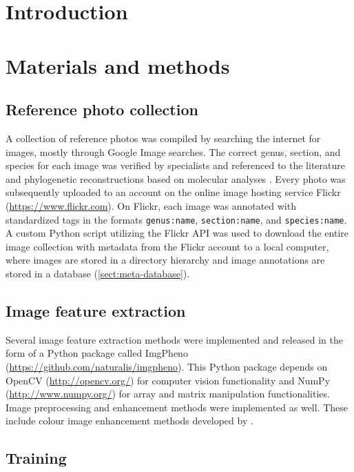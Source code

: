 \documentclass[review,3p,twocolumn]{elsarticle}
\begin{document}
\section{Introduction}
\label{sect:introduction}

\lipsum[1-3]

\section{Materials and methods}
\label{sect:methods}

\subsection{Reference photo collection}

A collection of reference photos was compiled by searching the internet for images, mostly through Google Image searches. The correct genus, section, and species for each image was verified by specialists and referenced to the literature \citet{Cribb1998, Pridgeon1999, Frosch2012} and phylogenetic reconstructions based on molecular analyses \citep{Li2011, Chochai2012}. Every photo was subsequently uploaded to an account on the online image hosting service Flickr (\url{https://www.flickr.com}). On Flickr, each image was annotated with standardized tags in the formats \texttt{genus:name}, \texttt{section:name}, and \texttt{species:name}. A custom Python script utilizing the Flickr API was used to download the entire image collection with metadata from the Flickr account to a local computer, where images are stored in a directory hierarchy and image annotations are stored in a database (\ref{sect:meta-database}).

\subsection{Image feature extraction}

Several image feature extraction methods were implemented and released in the form of a Python package called ImgPheno (\url{https://github.com/naturalis/imgpheno}). This Python package depends on OpenCV (\url{http://opencv.org/}) for computer vision functionality and NumPy (\url{http://www.numpy.org/}) for array and matrix manipulation functionalities. Image preprocessing and enhancement methods were implemented as well. These include colour image enhancement methods developed by \citet{Naik2003}.

\subsection{Training}
\end{document}
